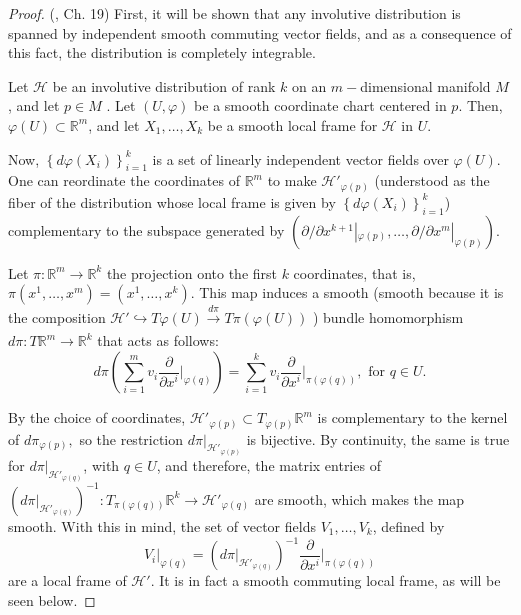 \documentclass[12pt, letterpaper, reqno]{amsart}
\theoremstyle{definition}
\theoremstyle{plain}
\theoremstyle{remark}
\begin{document}
\begin{proof}
	(\cite{lee2003introduction}, Ch. 19) First, it will be shown that any involutive distribution is spanned by independent smooth commuting vector fields, and as a consequence of this fact, the distribution is completely integrable.

	Let $ \mathcal{H} $ be an involutive distribution of rank $ k $ on an $ m- $dimensional manifold $ M $, and let $ p\in M $ . Let $ (U,\varphi) $ be a smooth coordinate chart centered in $ p. $ Then, $ \varphi(U)\subset \mathbb{R}^m $, and let $ X_1,\dots,X_k $ be a smooth local frame for $ \mathcal{H} $ in $ U. $

	Now, $ \left\{ d\varphi \left( X_i \right) \right\}_{i=1}^k $ is a set of linearly independent vector fields over $ \varphi(U). $ One can reordinate the coordinates of $ \mathbb{R}^m $ to make $ \mathcal{H}'_{\varphi(p)} $ (understood as the fiber of the distribution whose local frame is given by $ \left\{ d\varphi \left( X_i \right) \right\}_{i=1}^k $) complementary to the subspace generated by $ \left( \partial/\partial x^{k+1}|_{\varphi(p)},\dots,\partial/\partial x^{m}|_{\varphi(p)} \right). $   

	Let $ \pi: \mathbb{R}^m \rightarrow  \mathbb{R}^k$ the projection onto the first $ k $ coordinates, that is, $ \pi(x^1,\dots,x^m)=(x^1,\dots,x^k). $ This map induces a smooth (smooth because it is the composition $\mathcal{H}' \hookrightarrow T\varphi(U) \xrightarrow[]{d\pi} T\pi(\varphi(U))$ )  bundle homomorphism $ d\pi: T \mathbb{R}^m \rightarrow \mathbb{R}^k	 $ that acts as follows:
	$$ d\pi \left( \sum_{i=1}^m v_i \frac{\partial}{\partial x^i} \Big|_{\varphi(q)}   \right) = \sum_{i=1}^k v_i \frac{\partial}{\partial x^i} \Big|_{\pi(\varphi(q))}, \text{ for }q\in U.$$ 

	By the choice of coordinates, $ \mathcal{H}'_{\varphi(p)}\subset T_{\varphi(p)} \mathbb{R}^m $ is complementary to the kernel of $ d\pi_{\varphi(p)}, $ so the restriction $ d\pi|_{\mathcal{H}'_{\varphi(p)}} $ is bijective. By continuity, the same is true for $ d\pi|_{\mathcal{H}'_{\varphi(q)}} $, with $ q\in U $, and therefore, the matrix entries of $ \left(d\pi|_{\mathcal{H}'_{\varphi(q)}} \right)^{-1}: T_{\pi(\varphi(q))} \mathbb{R}^k \rightarrow \mathcal{H}'_{\varphi(q)}$ are smooth, which makes the map smooth. With this in mind, the set of vector fields $ V_1,\dots,V_k $, defined by
	$$ V_i|_{\varphi(q)}= \left(  d\pi|_{\mathcal{H}'_{\varphi(q)}}  \right)^{-1} \frac{\partial}{\partial x^i} \Big|_{\pi(\varphi(q))} $$ 
	are a local frame of $ \mathcal{H'}. $ It is in fact a smooth commuting local frame, as will be seen below. 


\end{proof}
\end{document}
